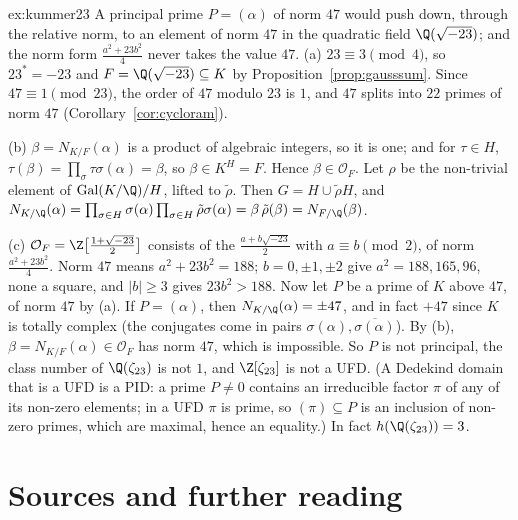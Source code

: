 \begin{solution}{ex:kummer23}
\idea A principal prime $P=(\alpha)$ of norm $47$ would push down, through the relative norm, to an element of norm $47$ in the
quadratic field $\Q(\sqrt{-23})$; and the norm form $\frac{a^2+23b^2}4$ never takes the value $47$.
\writeup (a) $23\equiv3\pmod4$, so $23^*=-23$ and $F=\Q(\sqrt{-23})\subseteq K$ by Proposition~\ref{prop:gausssum}. Since
$47\equiv1\pmod{23}$, the order of $47$ modulo $23$ is $1$, and $47$ splits into $22$ primes of norm $47$
(Corollary~\ref{cor:cycloram}).

(b) $\beta=N_{K/F}(\alpha)$ is a product of algebraic integers, so it is one; and for $\tau\in H$, $\tau(\beta)=\prod_\sigma
\tau\sigma(\alpha)=\beta$, so $\beta\in K^H=F$. Hence $\beta\in\mathcal O_F$. Let $\rho$ be the non-trivial element of
$\operatorname{Gal}(K/\Q)/H$, lifted to $\tilde\rho$. Then $G=H\cup\tilde\rho H$, and
$N_{K/\Q}(\alpha)=\prod_{\sigma\in H}\sigma(\alpha)\prod_{\sigma\in H}\tilde\rho\sigma(\alpha)=\beta\,\tilde\rho(\beta)=N_{F/\Q}(\beta)$.

(c) $\mathcal O_F=\Z\bigl[\frac{1+\sqrt{-23}}2\bigr]$ consists of the $\frac{a+b\sqrt{-23}}2$ with $a\equiv b\pmod2$, of norm
$\frac{a^2+23b^2}4$. Norm $47$ means $a^2+23b^2=188$; $b=0,\pm1,\pm2$ give $a^2=188,165,96$, none a square, and $|b|\ge3$ gives
$23b^2>188$. Now let $P$ be a prime of $K$ above $47$, of norm $47$ by (a). If $P=(\alpha)$, then $N_{K/\Q}(\alpha)=\pm47$, and
in fact $+47$ since $K$ is totally complex (the conjugates come in pairs $\sigma(\alpha),\overline{\sigma(\alpha)}$). By (b),
$\beta=N_{K/F}(\alpha)\in\mathcal O_F$ has norm $47$, which is impossible. So $P$ is not principal, the class number of
$\Q(\zeta_{23})$ is not $1$, and $\Z[\zeta_{23}]$ is not a UFD. (A Dedekind domain that is a UFD is a PID: a prime $P\ne0$ contains an
irreducible factor $\pi$ of any of its non-zero elements; in a UFD $\pi$ is prime, so $(\pi)\subseteq P$ is an inclusion of
non-zero primes, which are maximal, hence an equality.) In fact $h(\Q(\zeta_{23}))=3$.
\end{solution}

\section*{Sources and further reading}

